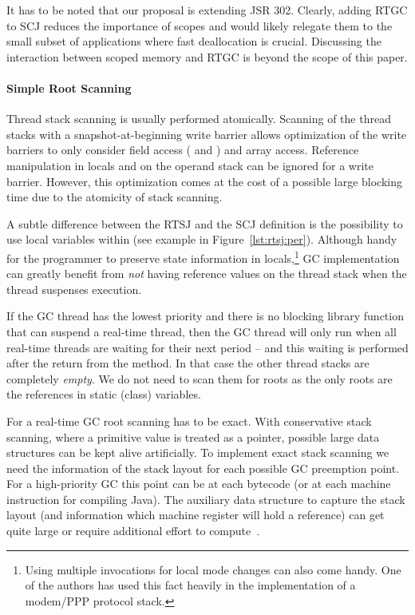 It has to be noted that our proposal is extending JSR 302. Clearly, adding
RTGC to SCJ reduces the importance of scopes and would likely relegate them
to the small subset of applications where fast deallocation is crucial.
Discussing the interaction between scoped memory  and RTGC is beyond
the scope of this paper.

\paragraph{Simple Root Scanning}

Thread stack scanning is usually performed atomically. Scanning of
the thread stacks with a snapshot-at-beginning write barrier
\cite{gc:yuasa90} allows optimization of the write barriers to only
consider field access ( and ) and
array access. Reference manipulation in locals and on the operand
stack can be ignored for a write barrier. However, this optimization
comes at the cost of a possible large blocking time due to the
atomicity of stack scanning.

A subtle difference between the RTSJ and the SCJ definition is the
possibility to use local variables within  (see example
in Figure~\ref{lst:rtsj:per}). Although handy for the programmer to
preserve state information in locals,\footnote{Using multiple
 invocations for local mode changes can also come
handy. One of the authors has used this fact heavily in the
implementation of a modem/PPP protocol stack.} GC implementation
can greatly benefit from \emph{not} having reference values on the
thread stack when the thread suspenses execution.

If the GC thread has the lowest priority and there is no blocking
library function that can suspend a real-time thread, then the GC
thread will only run when all real-time threads are waiting for
their next period -- and this waiting is performed after the return
from the  method.  In that case the other thread stacks
are completely \emph{empty}. We do not need to scan them for roots
as the only roots are the references in static (class) variables.


For a real-time GC root scanning has to be exact. With conservative stack
scanning, where a primitive value is treated as a pointer, possible large
data structures can be kept alive artificially. To implement exact stack
scanning we need the information of the stack layout for each possible GC
preemption point. For a high-priority GC this point can be at each bytecode
(or at each machine instruction for compiling Java). The auxiliary data
structure to capture the stack layout (and information which machine
register will hold a reference) can get quite large or require additional
effort to compute~\cite{cc07}.

